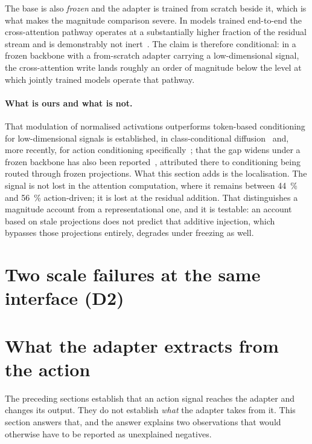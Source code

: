 The base is also \emph{frozen} and the adapter is trained from scratch
beside it, which is what makes the magnitude comparison severe. In models
trained end-to-end the cross-attention pathway operates at a substantially
higher fraction of the residual stream and is demonstrably not
inert~\citep{motif2026video}. The claim is therefore conditional: in a
frozen backbone with a from-scratch adapter carrying a low-dimensional
signal, the cross-attention write lands roughly an order of magnitude below
the level at which jointly trained models operate that pathway.

\paragraph{What is ours and what is not.} That modulation of normalised
activations outperforms token-based conditioning for low-dimensional signals
is established, in class-conditional
diffusion~\citep{peebles2023dit} and, more recently, for action
conditioning specifically~\citep{bai2026ioi, huang2026nano}; that the
gap widens under a frozen backbone has also been
reported~\citep{zhou2026decoupled}, attributed there to conditioning being routed
through frozen projections. What this section adds is the localisation. The
signal is not lost in the attention computation, where it remains between
\SI{44}{\percent} and \SI{56}{\percent} action-driven; it is lost at the
residual addition. That distinguishes a magnitude account from a
representational one, and it is testable: an account based on stale
projections does not predict that additive injection, which bypasses those
projections entirely, degrades under freezing as well.

\section{Two scale failures at the same interface (D2)}
\label{sec:res-scale}

\section{What the adapter extracts from the action}
\label{sec:res-decomposition}

The preceding sections establish that an action signal reaches the adapter
and changes its output. They do not establish \emph{what} the adapter takes
from it. This section answers that, and the answer explains two
observations that would otherwise have to be reported as unexplained
negatives.

